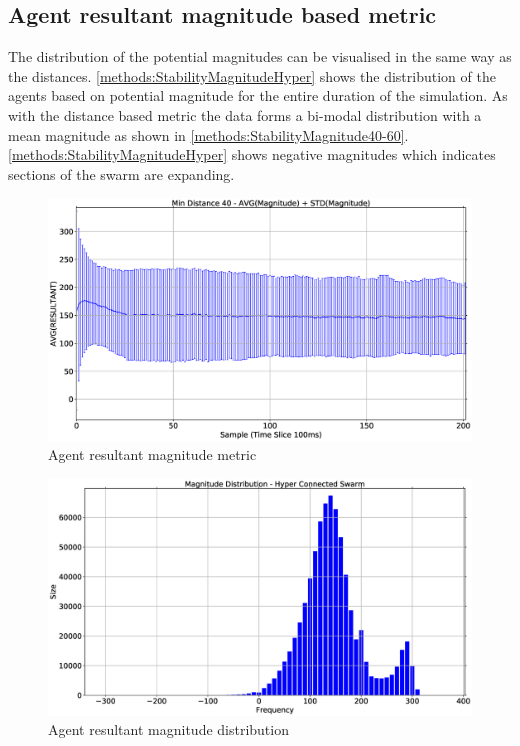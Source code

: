 \subsection{Agent resultant magnitude based metric}
The distribution of the potential magnitudes can be visualised in the same way as the distances. \autoref{methods:StabilityMagnitudeHyper} shows the distribution of the agents based on potential magnitude for the entire duration of the simulation. As with the distance based metric the data forms a bi-modal distribution with a mean magnitude as shown in \autoref{methods:StabilityMagnitude40-60}. \autoref{methods:StabilityMagnitudeHyper} shows negative magnitudes which indicates sections of the swarm are expanding. 
\begin{figure}[H]
\begin{center}
\includegraphics[width=13cm]{CHAPTER-5/figures/StabilityMagnitudeSwarm40-60}
\end{center}
\caption{Agent resultant magnitude metric\label{methods:StabilityMagnitude40-60}}
\end{figure}
\begin{figure}[H]
\begin{center}
\includegraphics[width=13cm]{CHAPTER-5/figures/StabilityMagnitudeHyper}
\end{center}
\caption{Agent resultant magnitude distribution\label{methods:StabilityMagnitudeHyper}}
\end{figure}


